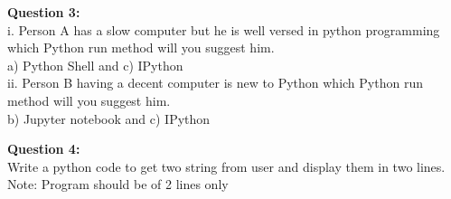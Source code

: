 \documentclass[a4paper,11pt,openright]{report}
\begin{document}
\vspace{30px}

\textbf{Question 3:}\\
i. Person A has a slow computer but he is well versed in python programming which Python run
method will you suggest him.\\
a) Python Shell and c) IPython\\
ii. Person B having a decent computer is new to Python which Python run method will you 
suggest him.\\
b) Jupyter notebook and c) IPython\\

\vspace{30px}

\textbf{Question 4:}\\
Write a python code to get two string from user and display them in two lines.\\
Note: Program should be of 2 lines only\\


\end{document}
